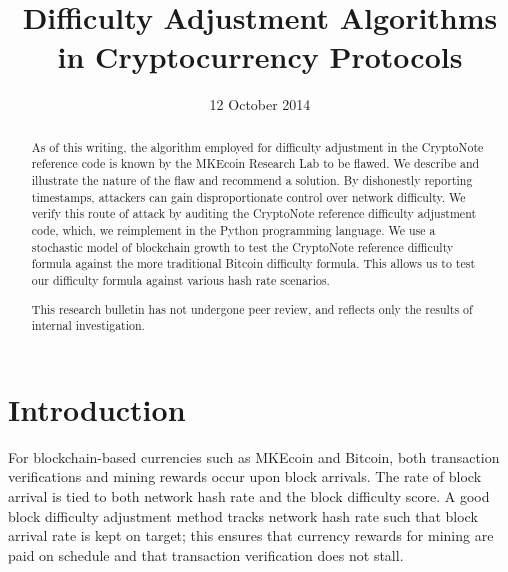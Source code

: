 \documentclass[12pt,english]{mrl}
\theoremstyle{definition}
\numberwithin{equation}{section}
\numberwithin{figure}{section}
\numberwithin{equation}{section}
\numberwithin{equation}{section}
\numberwithin{figure}{section}
\begin{document}
\begin{frontmatter}

\begin{fmbox}
\hfill\setlength{\fboxrule}{0px}\setlength{\fboxsep}{5px}
\title{Difficulty Adjustment Algorithms in Cryptocurrency Protocols}
\date{12 October 2014}
\author[
   addressref={mrl},
   email={lab@MKEcoin.cc}
]{ }
\author[
   addressref={mrl}
   email={lab@MKEcoin.cc}
]{ }


\address[id=mrl]{
}
\end{fmbox}

\begin{abstractbox}
\begin{abstract}
As of this writing, the algorithm employed for difficulty adjustment in the CryptoNote reference code is known by the MKEcoin Research Lab to be flawed. We describe and illustrate the nature of the flaw and recommend a solution. By dishonestly reporting timestamps, attackers can gain disproportionate control over network difficulty.  We verify this route of attack by auditing the CryptoNote reference difficulty adjustment code, which, we reimplement in the Python programming language.  We use a stochastic model of blockchain growth to test the CryptoNote reference difficulty formula against the more traditional Bitcoin difficulty formula. This allows us to test our difficulty formula against various hash rate scenarios.

This research bulletin has not undergone peer review, and reflects only the results of internal investigation.
\end{abstract}
\end{abstractbox}
\end{frontmatter}

\section{Introduction}\label{intro}

For blockchain-based currencies such as MKEcoin and Bitcoin, both transaction verifications and mining rewards occur upon block arrivals. The rate of block arrival is tied to both network hash rate and the block difficulty score. A good block difficulty adjustment method tracks network hash rate such that block arrival rate is kept on target; this ensures that currency rewards for mining are paid on schedule and that transaction verification does not stall.
\end{document}
